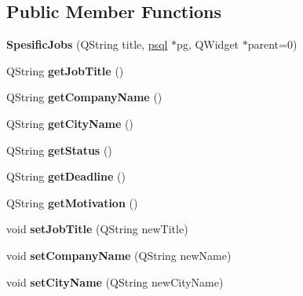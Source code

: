 \subsection*{Public Member Functions}
\begin{DoxyCompactItemize}
\item 
\mbox{\label{class_spesific_jobs_a382c130bb70f2bf25c76ef5c720659d6}} 
{\bfseries Spesific\+Jobs} (Q\+String title, \hyperlink{classpsql}{psql} $\ast$pg, Q\+Widget $\ast$parent=0)
\item 
\mbox{\label{class_spesific_jobs_afe77ad902d3e9f3cfd5f057e0a37a193}} 
Q\+String {\bfseries get\+Job\+Title} ()
\item 
\mbox{\label{class_spesific_jobs_a51afafde9872e78e8b09e3bc00a2a161}} 
Q\+String {\bfseries get\+Company\+Name} ()
\item 
\mbox{\label{class_spesific_jobs_a39390d9c54635a2dc60c80322a7b42ed}} 
Q\+String {\bfseries get\+City\+Name} ()
\item 
\mbox{\label{class_spesific_jobs_aefe905d920961199fec0aff37a34b50d}} 
Q\+String {\bfseries get\+Status} ()
\item 
\mbox{\label{class_spesific_jobs_a4744022c02271fabfb7fca0015896c09}} 
Q\+String {\bfseries get\+Deadline} ()
\item 
\mbox{\label{class_spesific_jobs_a73406f6204c990c3fa3c7b9d16f1b0b9}} 
Q\+String {\bfseries get\+Motivation} ()
\item 
\mbox{\label{class_spesific_jobs_abb4d8e45e0a2be8197ef03057fc5c714}} 
void {\bfseries set\+Job\+Title} (Q\+String new\+Title)
\item 
\mbox{\label{class_spesific_jobs_aeacc56572911219fddf2f1439a70ed74}} 
void {\bfseries set\+Company\+Name} (Q\+String new\+Name)
\item 
\mbox{\label{class_spesific_jobs_a67b162aa9ad12ed8ffba061edff96cdf}} 
void {\bfseries set\+City\+Name} (Q\+String new\+City\+Name)

\end{DoxyCompactItemize}
